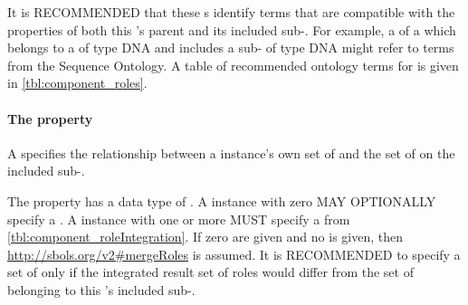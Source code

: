 It is RECOMMENDED that these  s identify terms that are compatible with the  properties of both this 's parent  and its included sub-. For example, a  of a  which belongs to a  of type DNA and includes a sub- of type DNA might refer to terms from the Sequence Ontology. A table of recommended ontology terms for  is given in \ref{tbl:component_roles}.



\paragraph{The  property}\label{sec:roleIntegration:C}


A  specifies the relationship between a  instance's own set of  and the set of  on the included sub-.

The  property has a data type of . A  instance with zero  MAY OPTIONALLY specify a . A  instance with one or more  MUST specify a  from \ref{tbl:component_roleIntegration}.
If zero   are given and no   is given, then \url{http://sbols.org/v2\#mergeRoles} is assumed.
It is RECOMMENDED to specify a set of   only if the integrated result set of roles would differ from the set of  belonging to this 's included sub-.


